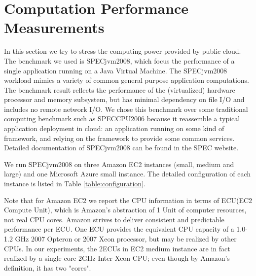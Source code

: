 \section{Computation Performance Measurements}
\label{section:compute}

In this section we try to stress the computing power provided by public cloud. The benchmark we used is SPECjvm2008, which focus the performance of a single application running on a Java Virtual Machine. The SPECjvm2008 workload mimics a variety of common general purpose application computations. The benchmark result reflects the performance of the (virtualized) hardware processor and memory subsystem, but has minimal dependency on file I/O and includes no remote network I/O. We chose this benchmark over some traditional computing benchmark such as SPECCPU2006 because it reassemble a typical application deployment in cloud: an application running on some kind of framework, and relying on the framework to provide some common services. Detailed documentation of SPECjvm2008 can be found in the SPEC website.

We run SPECjvm2008 on three Amazon EC2 instances (small, medium and large) and one Microsoft Azure small instance. The detailed configuration of each instance is listed in Table \ref{table:configuration}.

\begin{table*}
\caption{Detailed configuration of each instance used for measurement.}
\label{table:configuration}
\end{table*}

Note that for Amazon EC2 we report the CPU information in terms of ECU(EC2 Compute Unit), which is Amazon's abstraction of 1 Unit of computer resources, not real CPU cores. Amazon strives to deliver consistent and predictable performance per ECU. One ECU provides the equivalent CPU capacity of a 1.0-1.2 GHz 2007 Opteron or 2007 Xeon processor, but may be realized by other CPUs. In our experiments, the 2ECUs in EC2 medium instance are in fact realized by a single core 2GHz Inter Xeon CPU; even though by Amazon's definition, it has two "cores".

